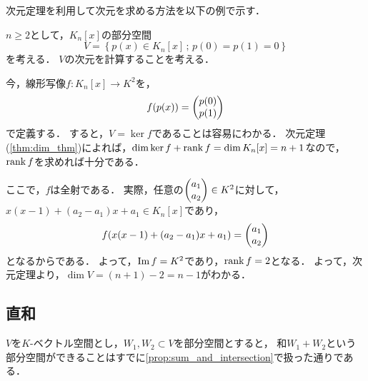 次元定理を利用して次元を求める方法を以下の例で示す．
\begin{example}
  $n \ge 2$として，$K_n[x]$の部分空間
  \[
    V = \left\{ p(x) \in K_n[x] \,;\, p(0)=p(1)=0 \right\}
  \]
  を考える．
  $V$の次元を計算することを考える．

  今，線形写像$f \colon K_n[x] \to K^2$を，
  \[
    f(p(x)) = \begin{pmatrix} p(0) \\ p(1) \end{pmatrix}
  \]
  で定義する．
  すると，$V = \ker f$であることは容易にわかる．
  次元定理(\cref{thm:dim_thm})によれば，$\dim \ker f + \mathrm{rank}\, f = \dim K_n[x] = n+1$なので，
  $\mathrm{rank}\, f$を求めれば十分である．
  
  ここで，$f$は全射である．
  実際，任意の$\begin{pmatrix} a_1 \\ a_2 \end{pmatrix} \in K^2$に対して，$x(x-1)+(a_2-a_1)x+a_1 \in K_n[x]$であり，
  \[
    f(x(x-1)+(a_2-a_1)x+a_1) = \begin{pmatrix} a_1 \\ a_2 \end{pmatrix}
  \]
  となるからである．
  よって，$\mathrm{Im}\, f = K^2$であり，$\mathrm{rank}\, f = 2$となる．
  よって，次元定理より，$\dim V = (n+1)-2 = n - 1$がわかる．
\end{example}
\subsection{直和}
$V$を$K$-ベクトル空間とし，$W_1,W_2 \subset V$を部分空間とすると，
和$W_1 + W_2$という部分空間ができることはすでに\cref{prop:sum_and_intersection}で扱った通りである．

